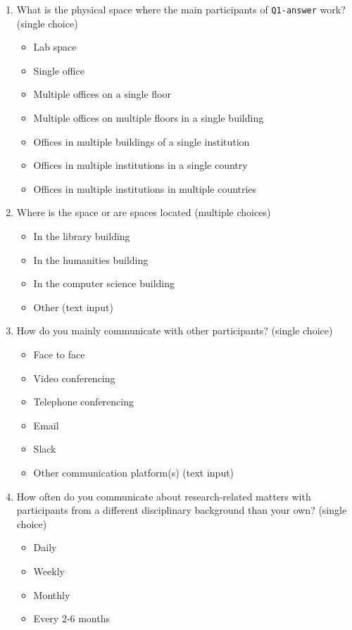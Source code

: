 \documentclass{article}
\begin{document}
\begin{enumerate}
    \item What is the physical space where the main participants of \texttt{Q1-answer} work? (single choice)
    \begin{itemize}
        \item Lab space
        \item Single office
        \item Multiple offices on a single floor
        \item Multiple offices on multiple floors in a single building
        \item Offices in multiple buildings of a single institution
        \item Offices in multiple institutions in a single country
        \item Offices in multiple institutions in multiple countries
    \end{itemize}
    \item Where is the space or are spaces located (multiple choices)
    \begin{itemize}
        \item In the library building
        \item In the humanities building
        \item In the computer science building
        \item Other (text input)
    \end{itemize}
    \item How do you mainly communicate with other participants? (single choice)
    \begin{itemize}
        \item Face to face
        \item Video conferencing
        \item Telephone conferencing
        \item Email
        \item Slack
        \item Other communication platform(s) (text input)
    \end{itemize}
    \item How often do you communicate about research-related matters with participants from a different disciplinary background than your own? (single choice)
    \begin{itemize}
        \item Daily
        \item Weekly
        \item Monthly
        \item Every 2-6 months

\end{itemize}
\end{enumerate}
\end{document}
